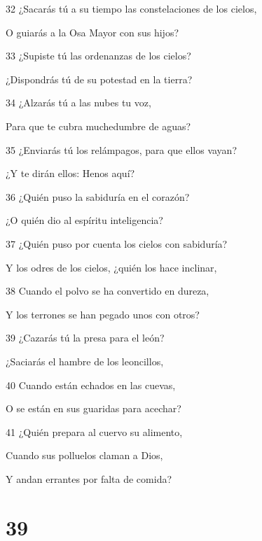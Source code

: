 \par 32 ¿Sacarás tú a su tiempo las constelaciones de los cielos,
\par O guiarás a la Osa Mayor con sus hijos?
\par 33 ¿Supiste tú las ordenanzas de los cielos?
\par ¿Dispondrás tú de su potestad en la tierra?
\par 34 ¿Alzarás tú a las nubes tu voz,
\par Para que te cubra muchedumbre de aguas?
\par 35 ¿Enviarás tú los relámpagos, para que ellos vayan?
\par ¿Y te dirán ellos: Henos aquí?
\par 36 ¿Quién puso la sabiduría en el corazón?
\par ¿O quién dio al espíritu inteligencia?
\par 37 ¿Quién puso por cuenta los cielos con sabiduría?
\par Y los odres de los cielos, ¿quién los hace inclinar,
\par 38 Cuando el polvo se ha convertido en dureza,
\par Y los terrones se han pegado unos con otros?
\par 39 ¿Cazarás tú la presa para el león?
\par ¿Saciarás el hambre de los leoncillos,
\par 40 Cuando están echados en las cuevas,
\par O se están en sus guaridas para acechar?
\par 41 ¿Quién prepara al cuervo su alimento,
\par Cuando sus polluelos claman a Dios,
\par Y andan errantes por falta de comida?

\chapter{39}

